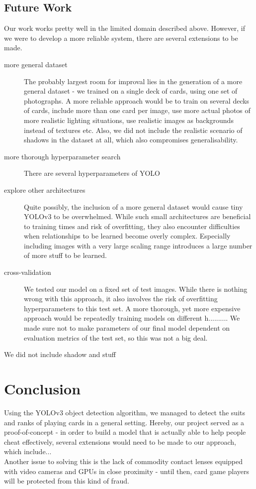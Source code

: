 \documentclass[a4paper]{article}
\begin{document}
\subsection{Future Work}
Our work works pretty well in the limited domain described above. However, if we were to develop a more reliable system, there are several extensions to be made.
\begin{description}
\item[more general dataset] The probably largest room for improval lies in the generation of a more general dataset - we trained on a single deck of cards, using one set of photographs. A more reliable approach would be to train on several decks of cards, include more than one card per image, use more actual photos of more realistic lighting situations, use realistic images as backgrounds instead of textures etc.
Also, we did not include the realistic scenario of shadows in the dataset at all, which also compromises generalisability.
\item[more thorough hyperparameter search] There are several hyperparameters of YOLO

\item[explore other architectures] Quite possibly, the inclusion of a more general dataset would cause tiny YOLOv3 to be overwhelmed. While such small architectures are beneficial to training times and risk of overfitting, they also encounter difficulties when relationships to be learned become overly complex. Especially including images with a very large scaling range introduces a large number of more stuff to be learned.
\item[cross-validation] We tested our model on a fixed set of test images. While there is nothing wrong with this approach, it also involves the risk of overfitting hyperparameters to this test set. A more thorough, yet more expensive approach would be repeatedly training models on different h.......... We made sure not to make parameters of our final model dependent on evaluation metrics of the test set, so this was not a big deal.
\end{description}
We did not include shadow and stuff
\section{Conclusion}
Using the YOLOv3 object detection algorithm, we managed to detect the suits and ranks of playing cards in a general setting. Hereby, our project served as a proof-of-concept - in order to build a model that is actually able to help people cheat effectively, several extensions would need to be made to our approach, which include... \\ Another issue to solving this is the lack of commodity contact lenses equipped with video cameras and GPUs in close proximity - until then, card game players will be protected from this kind of fraud.


\end{document}
